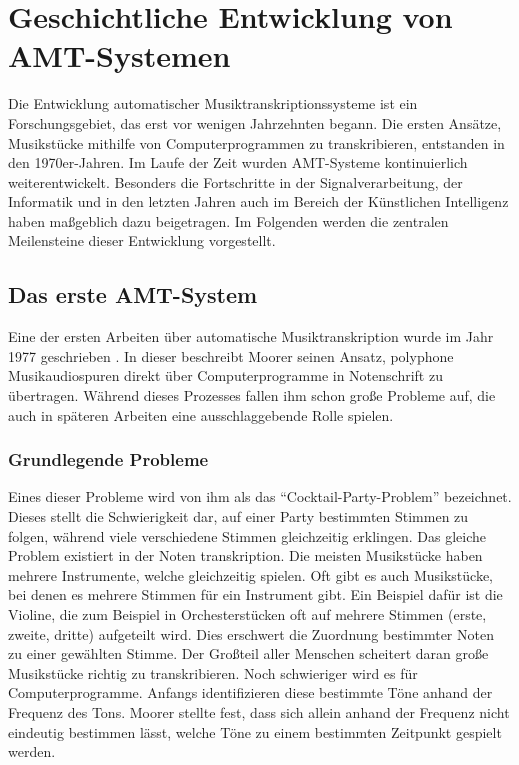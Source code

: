 \section{Geschichtliche Entwicklung von AMT-Systemen}
Die Entwicklung automatischer Musiktranskriptionssysteme ist ein Forschungsgebiet, das erst vor wenigen Jahrzehnten begann.
Die ersten Ansätze, Musikstücke mithilfe von Computerprogrammen zu transkribieren, entstanden in den 1970er-Jahren.
Im Laufe der Zeit wurden AMT-Systeme kontinuierlich weiterentwickelt.
Besonders die Fortschritte in der Signalverarbeitung,
der Informatik und in den letzten Jahren auch im Bereich der Künstlichen Intelligenz haben maßgeblich dazu beigetragen.
Im Folgenden werden die zentralen Meilensteine dieser Entwicklung vorgestellt.

\subsection{Das erste AMT-System}
Eine der ersten Arbeiten über automatische Musiktranskription wurde im Jahr 1977 geschrieben \cite{Moorer1977}.
In dieser beschreibt Moorer seinen Ansatz, polyphone Musikaudiospuren
direkt über Computerprogramme in Notenschrift zu übertragen.
Während dieses Prozesses fallen ihm schon große Probleme auf, die auch in späteren Arbeiten
eine ausschlaggebende Rolle spielen.

\subsubsection{Grundlegende Probleme}
Eines dieser Probleme wird von ihm als das \enquote{Cocktail-Party-Problem} bezeichnet.
Dieses stellt die Schwierigkeit dar, auf einer Party bestimmten Stimmen zu folgen, während viele verschiedene Stimmen
gleichzeitig erklingen.
Das gleiche Problem existiert in der Noten transkription.
Die meisten Musikstücke haben mehrere Instrumente, welche gleichzeitig spielen.
Oft gibt es auch Musikstücke, bei denen es mehrere Stimmen für ein Instrument gibt.
Ein Beispiel dafür ist die Violine, die zum Beispiel in Orchesterstücken oft auf mehrere Stimmen (erste, zweite, dritte) aufgeteilt wird.
Dies erschwert die Zuordnung bestimmter Noten zu einer gewählten Stimme.
Der Großteil aller Menschen scheitert daran große Musikstücke richtig zu transkribieren.
Noch schwieriger wird es für Computerprogramme.
Anfangs identifizieren diese bestimmte Töne anhand der Frequenz des Tons.
Moorer stellte fest, dass sich allein anhand der Frequenz nicht eindeutig bestimmen lässt,
welche Töne zu einem bestimmten Zeitpunkt gespielt werden.

